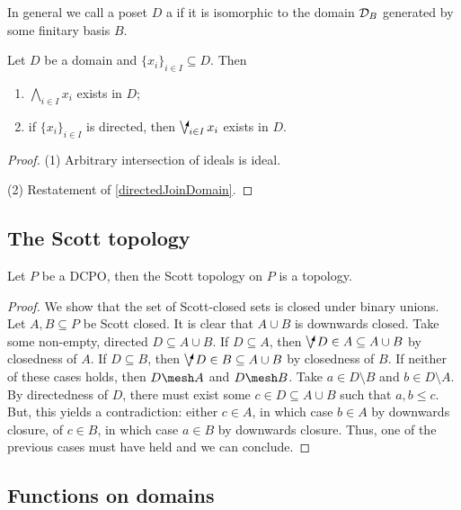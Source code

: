 \begin{definition}
In general we call a poset $D$ a  if it is isomorphic to the domain $\mathcal{D}_B$ generated by some finitary basis $B$.
\end{definition}

\begin{lemma}
Let $D$ be a domain and $\{x_i\}_{i\in I}\subseteq D$. Then
\begin{enumerate}
\item $\bigwedge_{i\in I} x_i$ exists in $D$;
\item if $\{x_i\}_{i\in I}$ is directed, then $\dirvee_{i\in I} x_i$ exists in $D$.
\end{enumerate}
\end{lemma}
\begin{proof}
(1) Arbitrary intersection of ideals is ideal.

(2) Restatement of \ref{directedJoinDomain}.
\end{proof}

\subsection{The Scott topology}


\begin{proposition}
Let $P$ be a DCPO, then the Scott topology on $P$ is a topology.
\end{proposition}
\begin{proof}
We show that the set of Scott-closed sets is closed under binary unions. Let $A,B \subseteq P$ be Scott closed. It is clear that $A\cup B$ is downwards closed. Take some non-empty, directed $D\subseteq A\cup B$. If $D\subseteq A$, then $\dirvee D \in A \subseteq A\cup B$ by closedness of $A$. If $D\subseteq B$, then $\dirvee D \in B \subseteq A\cup B$ by closedness of $B$. If neither of these cases holds, then $D\mesh A$ and $D\mesh B$. Take $a\in D\setminus B$ and $b\in D\setminus A$. By directedness of $D$, there must exist some $c\in D\subseteq A\cup B$ such that $a,b\leq c$. But, this yields a contradiction: either $c\in A$, in which case $b\in A$ by downwards closure, of $c\in B$, in which case $a\in B$ by downwards closure. Thus, one of the previous cases must have held and we can conclude.
\end{proof}

\subsection{Functions on domains}

